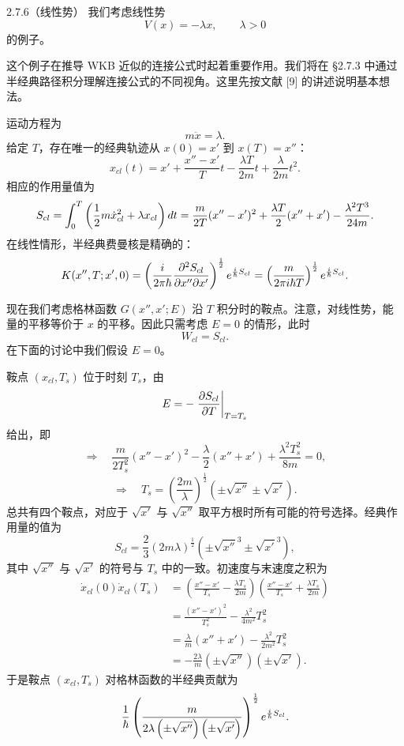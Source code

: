 \begin{example}{2.7.6（线性势）}
  我们考虑线性势
  \[
  V(x)=-\lambda x,\qquad \lambda>0
  \]
  的例子。

  这个例子在推导 WKB 近似的连接公式时起着重要作用。我们将在 §2.7.3 中通过半经典路径积分理解连接公式的不同视角。这里先按文献 [9] 的讲述说明基本想法。

  运动方程为
  \[
  m\ddot x=\lambda.
  \]
  给定 $T$，存在唯一的经典轨迹从 $x(0)=x'$ 到 $x(T)=x''$：
  \[
  x_{cl}(t)=x'+\frac{x''-x'}{T}t-\frac{\lambda T}{2m}t+\frac{\lambda}{2m}t^2.
  \]
  相应的作用量值为
  \[
  S_{cl}=\int_0^T\left(\frac12 m\dot x_{cl}^2+\lambda x_{cl}\right)d t
  =\frac{m}{2T}(x''-x')^2+\frac{\lambda T}{2}(x''+x')-\frac{\lambda^2T^3}{24m}.
  \]
  在线性情形，半经典费曼核是精确的：
  \[
  K(x'',T;x',0)=
  \left(\frac{i}{2\pi\hbar}\frac{\partial^2 S_{cl}}{\partial x''\partial x'}\right)^{\frac12}
  e^{\frac{i}{\hbar}S_{cl}}
  =\left(\frac{m}{2\pi i\hbar T}\right)^{\frac12}
  e^{\frac{i}{\hbar}S_{cl}}.
  \]

  现在我们考虑格林函数 $G(x'',x';E)$ 沿 $T$ 积分时的鞍点。注意，对线性势，能量的平移等价于 $x$ 的平移。因此只需考虑 $E=0$ 的情形，此时
  \[
  W_{cl}=S_{cl}.
  \]
  在下面的讨论中我们假设 $E=0$。

  鞍点 $(x_{cl},T_s)$ 位于时刻 $T_s$，由
  \[
  E=-\left.\frac{\partial S_{cl}}{\partial T}\right|_{T=T_s}
  \]
  给出，即
  \[
  \Longrightarrow\quad
  \frac{m}{2T_s^2}(x''-x')^2-\frac{\lambda}{2}(x''+x')+\frac{\lambda^2T_s^2}{8m}=0,
  \]
  \[
  \Longrightarrow\quad
  T_s=\left(\frac{2m}{\lambda}\right)^{\frac12}
  \left(\pm\sqrt{x''}\pm\sqrt{x'}\right).
  \]
  总共有四个鞍点，对应于 $\sqrt{x'}$ 与 $\sqrt{x''}$ 取平方根时所有可能的符号选择。经典作用量的值为
  \[
  S_{cl}=\frac23(2m\lambda)^{\frac12}
  \left(\pm\sqrt{x''}^3\pm\sqrt{x'}^3\right),
  \]
  其中 $\sqrt{x''}$ 与 $\sqrt{x'}$ 的符号与 $T_s$ 中的一致。初速度与末速度之积为
  \[
  \begin{aligned}
  \dot x_{cl}(0)\dot x_{cl}(T_s)
  &=\left(\frac{x''-x'}{T_s}-\frac{\lambda T_s}{2m}\right)
  \left(\frac{x''-x'}{T_s}+\frac{\lambda T_s}{2m}\right)\\
  &=\frac{(x''-x')^2}{T_s^2}-\frac{\lambda^2}{4m^2}T_s^2\\
  &=\frac{\lambda}{m}(x''+x')-\frac{\lambda^2}{2m^2}T_s^2\\
  &=-\frac{2\lambda}{m}\left(\pm\sqrt{x''}\right)\left(\pm\sqrt{x'}\right).
  \end{aligned}
  \]
  于是鞍点 $(x_{cl},T_s)$ 对格林函数的半经典贡献为
  \[
  \frac1{\hbar}
  \left(\frac{m}{2\lambda\left(\pm\sqrt{x''}\right)\left(\pm\sqrt{x'}\right)}
  \right)^{\frac12}e^{\frac{i}{\hbar}S_{cl}}.
  \]


\end{example}
